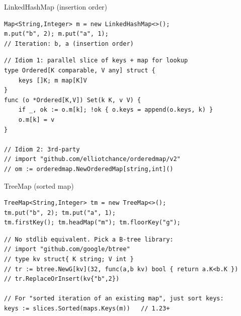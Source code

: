 \documentclass[10pt]{article}
\begin{document}

\begin{construct}{LinkedHashMap (insertion order)}
\noindent
\begin{minipage}[t]{0.485\linewidth}
\begin{lstlisting}[style=java, title=Java]
Map<String,Integer> m = new LinkedHashMap<>();
m.put("b", 2); m.put("a", 1);
// Iteration: b, a (insertion order)
\end{lstlisting}
\end{minipage}\hfill
\begin{minipage}[t]{0.485\linewidth}
\begin{lstlisting}[style=go, title=Go]
// Idiom 1: parallel slice of keys + map for lookup
type Ordered[K comparable, V any] struct {
    keys []K; m map[K]V
}
func (o *Ordered[K,V]) Set(k K, v V) {
    if _, ok := o.m[k]; !ok { o.keys = append(o.keys, k) }
    o.m[k] = v
}

// Idiom 2: 3rd-party
// import "github.com/elliotchance/orderedmap/v2"
// om := orderedmap.NewOrderedMap[string,int]()
\end{lstlisting}
\end{minipage}
\end{construct}

\begin{construct}{TreeMap (sorted map)}
\noindent
\begin{minipage}[t]{0.485\linewidth}
\begin{lstlisting}[style=java, title=Java]
TreeMap<String,Integer> tm = new TreeMap<>();
tm.put("b", 2); tm.put("a", 1);
tm.firstKey(); tm.headMap("m"); tm.floorKey("g");
\end{lstlisting}
\end{minipage}\hfill
\begin{minipage}[t]{0.485\linewidth}
\begin{lstlisting}[style=go, title=Go]
// No stdlib equivalent. Pick a B-tree library:
// import "github.com/google/btree"
// type kv struct{ K string; V int }
// tr := btree.NewG[kv](32, func(a,b kv) bool { return a.K<b.K })
// tr.ReplaceOrInsert(kv{"b",2})

// For "sorted iteration of an existing map", just sort keys:
keys := slices.Sorted(maps.Keys(m))   // 1.23+
\end{lstlisting}
\end{minipage}
\end{construct}

\end{document}
